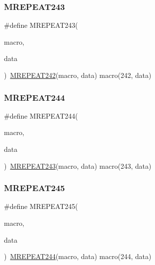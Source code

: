 \mbox{\label{group__group__sam0__utils__mrepeat_ga3780c0d880e8f0fef0b734f8491388a1}} 
\subsubsection{\texorpdfstring{MREPEAT243}{MREPEAT243}}
{\footnotesize\ttfamily \#define M\+R\+E\+P\+E\+A\+T243(\begin{DoxyParamCaption}\item[{}]{macro,  }\item[{}]{data }\end{DoxyParamCaption})~\mbox{\hyperlink{group__group__sam0__utils__mrepeat_gae6db0e42b34f92c59c76e0364573db92}{M\+R\+E\+P\+E\+A\+T242}}(macro, data)   macro(242, data)}

\mbox{\label{group__group__sam0__utils__mrepeat_ga96b96568f137828bd94f1df72f9ea533}} 
\subsubsection{\texorpdfstring{MREPEAT244}{MREPEAT244}}
{\footnotesize\ttfamily \#define M\+R\+E\+P\+E\+A\+T244(\begin{DoxyParamCaption}\item[{}]{macro,  }\item[{}]{data }\end{DoxyParamCaption})~\mbox{\hyperlink{group__group__sam0__utils__mrepeat_ga3780c0d880e8f0fef0b734f8491388a1}{M\+R\+E\+P\+E\+A\+T243}}(macro, data)   macro(243, data)}

\mbox{\label{group__group__sam0__utils__mrepeat_gaef88abd24a21c1424bcef16151f33acc}} 
\subsubsection{\texorpdfstring{MREPEAT245}{MREPEAT245}}
{\footnotesize\ttfamily \#define M\+R\+E\+P\+E\+A\+T245(\begin{DoxyParamCaption}\item[{}]{macro,  }\item[{}]{data }\end{DoxyParamCaption})~\mbox{\hyperlink{group__group__sam0__utils__mrepeat_ga96b96568f137828bd94f1df72f9ea533}{M\+R\+E\+P\+E\+A\+T244}}(macro, data)   macro(244, data)}

